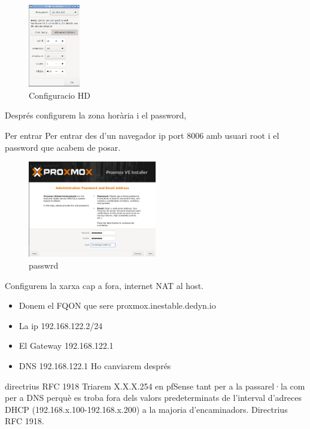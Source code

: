 \documentclass[
  10pt,
]{krantz}
\providecommand{\tightlist}{%
  \setlength{\itemsep}{0pt}\setlength{\parskip}{0pt}}
\begin{document}
\begin{figure}
\centering
\includegraphics[width=0.2\textwidth,height=\textheight]{imatges/proxmox/proxmox_ins7.png}
\caption{Configuracio HD}
\end{figure}

Després configurem la zona horària i el password,

\begin{rmdtip}{Per entrar}
Per entrar des d'un navegador ip port 8006 amb usuari root i el password que acabem de posar.

\end{rmdtip}

\begin{figure}
\centering
\includegraphics[width=0.5\textwidth,height=\textheight]{imatges/proxmox/proxmox_ins10.png}
\caption{passwrd}
\end{figure}

Configurem la xarxa cap a fora, internet NAT al host.

\begin{itemize}
\tightlist
\item
  Donem el FQON que sere proxmox.inestable.dedyn.io
\item
  La ip 192.168.122.2/24
\item
  El Gateway 192.168.122.1
\item
  DNS 192.168.122.1 Ho canviarem després
\end{itemize}

\begin{rmdcuidao}{directrius RFC 1918}
Triarem X.X.X.254 en pfSense tant per a la passarel·la com per a DNS perquè es troba fora dels valors predeterminats de l'interval d'adreces DHCP (192.168.x.100-192.168.x.200) a la majoria d'encaminadors. Directrius RFC 1918.

\end{rmdcuidao}
\end{document}

